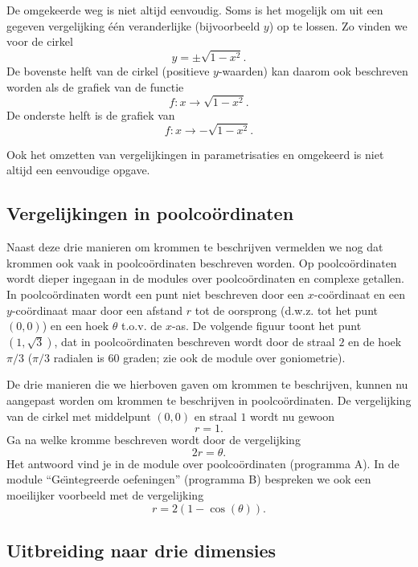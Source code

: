 \documentclass{ximera}
\begin{document}
De omgekeerde weg is niet altijd eenvoudig. Soms is het mogelijk om
uit een gegeven vergelijking \'e\'en veranderlijke (bijvoorbeeld $y$)
op te lossen. Zo vinden we voor de cirkel
\[
y=\pm\sqrt{1-x^2}.
\]
De bovenste helft van de cirkel (positieve $y$-waarden) kan daarom ook
beschreven worden als de grafiek van de functie
\[
f:x\rightarrow \sqrt{1-x^2}.
\]
De onderste helft is de grafiek van
\[
f:x\rightarrow -\sqrt{1-x^2}.
\]

Ook het omzetten van vergelijkingen in parametrisaties en omgekeerd is
niet altijd een eenvoudige opgave.

\subsection{Vergelijkingen in poolco\"ordinaten}

Naast deze drie manieren om krommen te beschrijven vermelden we nog
dat krommen ook vaak in poolco\"ordinaten beschreven worden.  Op
poolco\"ordinaten wordt dieper ingegaan in de modules over
poolco\"ordinaten en complexe getallen. In poolco\"ordinaten wordt een
punt niet beschreven door een $x$-co\"ordinaat en een $y$-co\"ordinaat
maar door een afstand $r$ tot de oorsprong (d.w.z. tot het punt
$(0,0)$) en een hoek $\theta$ t.o.v. de $x$-as. De volgende figuur
toont het punt $(1,\sqrt{3})$, dat in poolco\"ordinaten beschreven
wordt door de straal $2$ en de hoek $\pi/3$ ($\pi/3$ radialen is $60$
graden; zie ook de module over goniometrie).



De drie manieren die we hierboven gaven om krommen te beschrijven,
kunnen nu aangepast worden om krommen te beschrijven in
poolco\"ordinaten. De vergelijking van de cirkel met middelpunt
$(0,0)$ en straal $1$ wordt nu gewoon
\[
r=1.
\]
Ga na welke kromme beschreven wordt door de vergelijking
\[
2r=\theta.
\]
Het antwoord vind je in de module over poolco\"ordinaten
(programma A). In de module ``Ge\"\i ntegreerde oefeningen''
(programma B) bespreken we ook een moeilijker voorbeeld met de vergelijking
\[
r=2(1-\cos(\theta)).
\]

\subsection{Uitbreiding naar drie dimensies}
\end{document}
